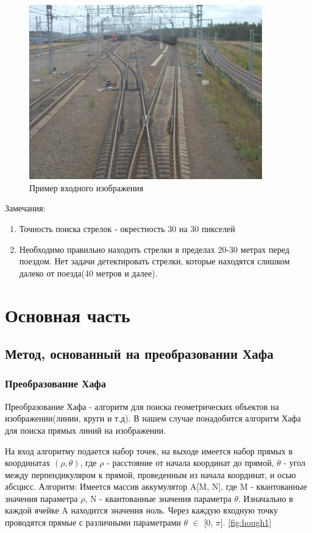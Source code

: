 \begin{figure}[!h]
	\centering
	\includegraphics[width=0.9\textwidth]{pictures/img0002.jpg} 
	\caption{Пример входного изображения}
	\label{fig:input}
\end{figure}

\newpage
Замечания: 
\begin{enumerate}
	\item Точность поиска стрелок - окрестность 30 на 30 пикселей
	\item Необходимо правильно находить стрелки в пределах 20-30 метрах перед поездом. Нет задачи детектировать стрелки, которые находятся слишком далеко от поезда(40 метров и далее).
\end{enumerate}


\section{Основная часть}
\subsection{Метод, основанный на преобразовании Хафа}
\subsubsection{Преобразование Хафа}
Преобразование Хафа \cite{b:hough_transform} - алгоритм для поиска геометрических объектов на изображении(линии, круги и т.д). В нашем случае понадобится алгоритм Хафа для поиска прямых линий на изображении. 

На вход алгоритму подается набор точек, на выходе имеется набор прямых в координатах $(\rho, \theta)$, где $\rho$ - расстояние от начала координат до прямой, $\theta$ - угол между перпендикуляром к прямой, проведенным из начала координат, и осью абсцисс.
\newline
Алгоритм:
\newline
Имеется массив аккумулятор A[M, N], где M - квантованные значения параметра $\rho$, N - квантованные значения параметра $\theta$. Изначально в каждой ячейке A находится значения ноль.
\newline
Через каждую входную точку проводятся прямые с различными параметрами $\theta$ $\in$ [0, $\pi$]. \ref{fig:hough1}

